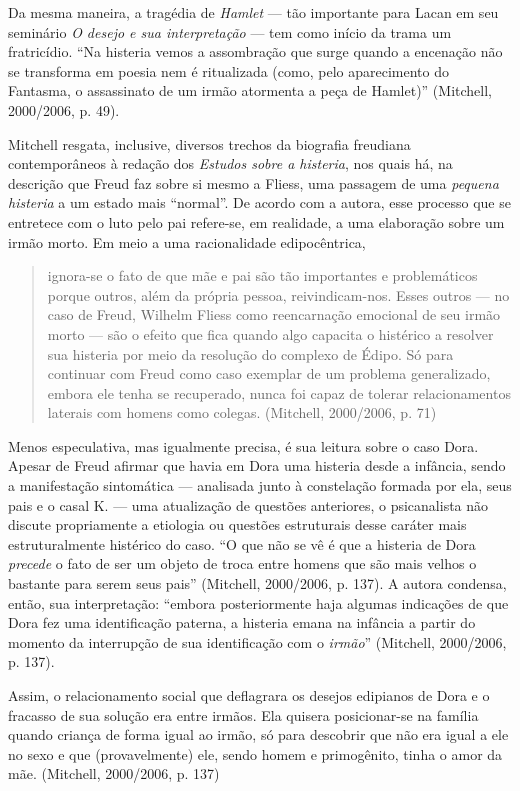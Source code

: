 Da mesma maneira, a tragédia de \emph{Hamlet} --- tão importante para
Lacan em seu seminário \emph{O desejo e sua interpretação} --- tem como
início da trama um fratricídio. ``Na histeria vemos a assombração que
surge quando a encenação não se transforma em poesia nem é ritualizada
(como, pelo aparecimento do Fantasma, o assassinato de um irmão
atormenta a peça de Hamlet)'' (Mitchell, 2000/2006, p. 49).

Mitchell resgata, inclusive, diversos trechos da biografia freudiana
contemporâneos à redação dos \emph{Estudos sobre a histeria}, nos quais
há, na descrição que Freud faz sobre si mesmo a Fliess, uma passagem de
uma \emph{pequena histeria} a um estado mais ``normal''. De acordo com a
autora, esse processo que se entretece com o luto pelo pai refere-se, em
realidade, a uma elaboração sobre um irmão morto. Em meio a uma
racionalidade edipocêntrica,

\begin{quote}
ignora-se o fato de que mãe e pai são tão importantes e problemáticos
porque outros, além da própria pessoa, reivindicam-nos. Esses outros ---
no caso de Freud, Wilhelm Fliess como reencarnação emocional de seu
irmão morto --- são o efeito que fica quando algo capacita o histérico a
resolver sua histeria por meio da resolução do complexo de Édipo. Só
para continuar com Freud como caso exemplar de um problema generalizado,
embora ele tenha se recuperado, nunca foi capaz de tolerar
relacionamentos laterais com homens como colegas. (Mitchell, 2000/2006,
p. 71)
\end{quote}

Menos especulativa, mas igualmente precisa, é sua leitura sobre o caso
Dora. Apesar de Freud afirmar que havia em Dora uma histeria desde a
infância, sendo a manifestação sintomática --- analisada junto à
constelação formada por ela, seus pais e o casal K. --- uma atualização
de questões anteriores, o psicanalista não discute propriamente a
etiologia ou questões estruturais desse caráter mais estruturalmente
histérico do caso. ``O que não se vê é que a histeria de Dora
\emph{precede} o fato de ser um objeto de troca entre homens que são
mais velhos o bastante para serem seus pais'' (Mitchell, 2000/2006, p.
137). A autora condensa, então, sua interpretação: ``embora
posteriormente haja algumas indicações de que Dora fez uma identificação
paterna, a histeria emana na infância a partir do momento da interrupção
de sua identificação com o \emph{irmão}'' (Mitchell, 2000/2006, p. 137).

Assim, o relacionamento social que deflagrara os desejos edipianos de
Dora e o fracasso de sua solução era entre irmãos. Ela quisera
posicionar-se na família quando criança de forma igual ao irmão, só para
descobrir que não era igual a ele no sexo e que (provavelmente) ele,
sendo homem e primogênito, tinha o amor da mãe. (Mitchell, 2000/2006, p.
137)

